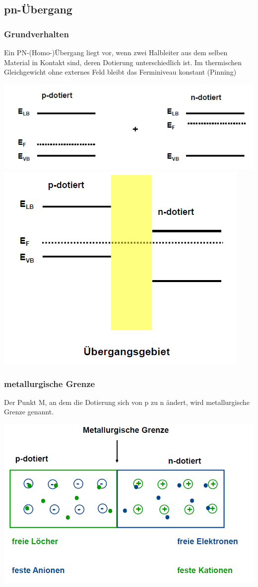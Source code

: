 
\subsection{pn-Übergang}
	\subsubsection{Grundverhalten}
	 	Ein PN-(Homo-)Übergang liegt vor, wenn zwei Halbleiter aus dem selben Material in Kontakt sind, deren Dotierung unterschiedlich ist. 
	 	\newline
	 	Im thermischen Gleichgewicht ohne externes Feld  	bleibt das Ferminiveau konstant (Pinning)
	 	\newline
	 	\begin{center}
	 		\includegraphics[width=0.6\linewidth]{Kapitel/Kap08/PN-uebergang_1.png}
		 	\includegraphics[width=0.35\linewidth]{Kapitel/Kap08/PN-uebergang_2.png}
		\end{center}
 	\subsubsection{metallurgische Grenze}
 		Der Punkt M, an dem die Dotierung sich von p zu n  	ändert, wird metallurgische Grenze genannt.
 		\begin{center}
 			\includegraphics[width=0.4\linewidth]{Kapitel/Kap08/metallurgischeGrenze}
 		\end{center}
 		
